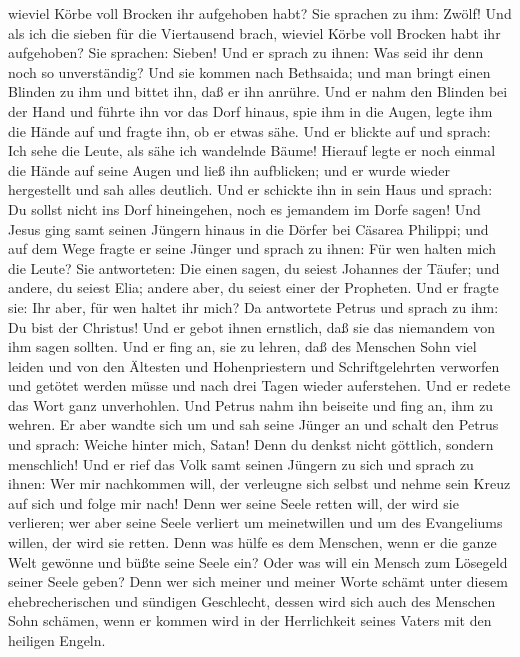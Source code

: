 wieviel Körbe voll Brocken ihr aufgehoben habt? Sie sprachen zu ihm:
Zwölf!  Und als ich die sieben für die Viertausend brach,
wieviel Körbe voll Brocken habt ihr aufgehoben? Sie sprachen: Sieben!
 Und er sprach zu ihnen: Was seid ihr denn noch so
unverständig?  Und sie kommen nach Bethsaida; und man
bringt einen Blinden zu ihm und bittet ihn, daß er ihn anrühre.
 Und er nahm den Blinden bei der Hand und führte ihn vor
das Dorf hinaus, spie ihm in die Augen, legte ihm die Hände auf und
fragte ihn, ob er etwas sähe.  Und er blickte auf und
sprach: Ich sehe die Leute, als sähe ich wandelnde Bäume!
 Hierauf legte er noch einmal die Hände auf seine Augen
und ließ ihn aufblicken; und er wurde wieder hergestellt und sah alles
deutlich.  Und er schickte ihn in sein Haus und sprach:
Du sollst nicht ins Dorf hineingehen, noch es jemandem im Dorfe sagen!
 Und Jesus ging samt seinen Jüngern hinaus in die Dörfer
bei Cäsarea Philippi; und auf dem Wege fragte er seine Jünger und sprach
zu ihnen: Für wen halten mich die Leute?  Sie
antworteten: Die einen sagen, du seiest Johannes der Täufer; und andere,
du seiest Elia; andere aber, du seiest einer der Propheten.
 Und er fragte sie: Ihr aber, für wen haltet ihr mich? Da
antwortete Petrus und sprach zu ihm: Du bist der Christus!
 Und er gebot ihnen ernstlich, daß sie das niemandem von
ihm sagen sollten.  Und er fing an, sie zu lehren, daß
des Menschen Sohn viel leiden und von den Ältesten und Hohenpriestern
und Schriftgelehrten verworfen und getötet werden müsse und nach drei
Tagen wieder auferstehen.  Und er redete das Wort ganz
unverhohlen. Und Petrus nahm ihn beiseite und fing an, ihm zu wehren.
 Er aber wandte sich um und sah seine Jünger an und
schalt den Petrus und sprach: Weiche hinter mich, Satan! Denn du denkst
nicht göttlich, sondern menschlich!  Und er rief das Volk
samt seinen Jüngern zu sich und sprach zu ihnen: Wer mir nachkommen
will, der verleugne sich selbst und nehme sein Kreuz auf sich und folge
mir nach!  Denn wer seine Seele retten will, der wird sie
verlieren; wer aber seine Seele verliert um meinetwillen und um des
Evangeliums willen, der wird sie retten.  Denn was hülfe
es dem Menschen, wenn er die ganze Welt gewönne und büßte seine Seele
ein?  Oder was will ein Mensch zum Lösegeld seiner Seele
geben?  Denn wer sich meiner und meiner Worte schämt
unter diesem ehebrecherischen und sündigen Geschlecht, dessen wird sich
auch des Menschen Sohn schämen, wenn er kommen wird in der Herrlichkeit
seines Vaters mit den heiligen Engeln.

